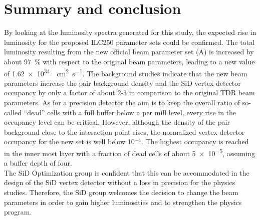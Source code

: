 \section{Summary and conclusion}
By looking at the luminosity spectra generated for this study, the expected rise in luminosity for the proposed ILC250 parameter sets could be confirmed.
The total luminosity resulting from the new official beam parameter set (A) is increased by about \SI{97}{\percent} with respect to the original beam parameters, leading to a new value of \SI{1.62e34}{\per\centi\meter\squared\per\second}.
The background studies indicate that the new beam parameters increase the \Pep\Pem pair background density and the SiD vertex detector occupancy by only a factor of about 2-3 in comparison to the original TDR beam parameters.
As for a precision detector the aim is to keep the overall ratio of so-called ``dead'' cells with a full buffer below a per mill level, every rise in the occupancy level can be critical.
However, although the density of the pair background close to the interaction point rises, the normalized vertex detector occupancy for the new set is well below 10$^{-4}$.
The highest occupancy is reached in the inner most layer with a fraction of dead cells of about \num{5e-5}, assuming a buffer depth of four.\\
The SiD Optimization group is confident that this can be accommodated in the design of the SiD vertex detector without a loss in precision for the physics studies.
Therefore, the SiD group welcomes the decision to change the beam parameters in order to gain higher luminosities and to strengthen the physics program.